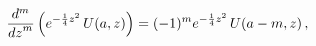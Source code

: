 \[\frac{{d}^{m}}{{dz}^{m}}\left(e^{-\frac{1}{4}z^{2}}\mathop{U\/}\nolimits\!%
\left(a,z\right)\right)=(-1)^{m}e^{-\frac{1}{4}z^{2}}\mathop{U\/}\nolimits\!%
\left(a-m,z\right),\]